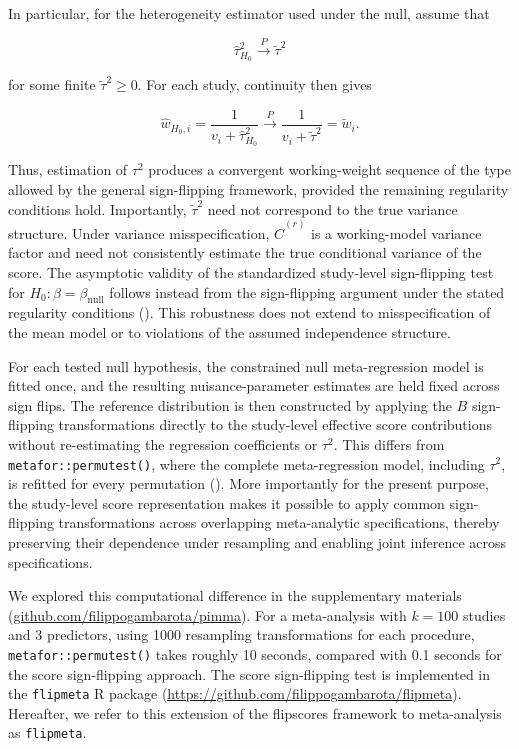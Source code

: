 \documentclass[
  man,
  longtable,
  nolmodern,
  notxfonts,
  notimes,
  colorlinks=true,linkcolor=blue,citecolor=blue,urlcolor=blue]{apa7}
\begin{document}
In particular, for the heterogeneity estimator used under the null,
assume that

\[
\hat{\tau}_{H_0}^2
\xrightarrow{P}
\widetilde{\tau}^2
\]

for some finite \(\widetilde{\tau}^2\geq0\). For each study, continuity
then gives

\[
\hat{w}_{H_0,i}
=
\frac{1}{v_i+\hat{\tau}_{H_0}^2}
\xrightarrow{P}
\frac{1}{v_i+\widetilde{\tau}^2}
=
\widetilde{w}_i.
\]

Thus, estimation of \(\tau^2\) produces a convergent working-weight
sequence of the type allowed by the general sign-flipping framework,
provided the remaining regularity conditions hold. Importantly,
\(\widetilde{\tau}^2\) need not correspond to the true variance
structure. Under variance misspecification, \(\widehat{C}^{(r)}\) is a
working-model variance factor and need not consistently estimate the
true conditional variance of the score. The asymptotic validity of the
standardized study-level sign-flipping test for
\(H_0:\beta=\beta_{\mathrm{null}}\) follows instead from the
sign-flipping argument under the stated regularity conditions
(). This
robustness does not extend to misspecification of the mean model or to
violations of the assumed independence structure.

For each tested null hypothesis, the constrained null meta-regression
model is fitted once, and the resulting nuisance-parameter estimates are
held fixed across sign flips. The reference distribution is then
constructed by applying the \(B\) sign-flipping transformations directly
to the study-level effective score contributions without re-estimating
the regression coefficients or \(\tau^2\). This differs from
\texttt{metafor::permutest()}, where the complete meta-regression model,
including \(\tau^2\), is refitted for every permutation
(). More
importantly for the present purpose, the study-level score
representation makes it possible to apply common sign-flipping
transformations across overlapping meta-analytic specifications, thereby
preserving their dependence under resampling and enabling joint
inference across specifications.

We explored this computational difference in the supplementary materials
(\href{https://github.com/filippogambarota/pimma}{github.com/filippogambarota/pimma}).
For a meta-analysis with \(k = 100\) studies and 3 predictors, using
1000 resampling transformations for each procedure,
\texttt{metafor::permutest()} takes roughly 10 seconds, compared with
0.1 seconds for the score sign-flipping approach. The score
sign-flipping test is implemented in the \texttt{flipmeta} R package
(\url{https://github.com/filippogambarota/flipmeta}). Hereafter, we
refer to this extension of the flipscores framework to meta-analysis as
\texttt{flipmeta}.
\end{document}
